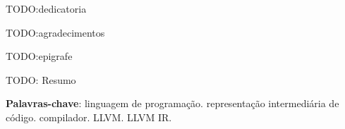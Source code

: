 \documentclass[
  english,
  lmodern,
  oneside
]{ufsc-thesis-rn46-2019/ufsc-thesis-rn46-2019}
\begin{document}
\pretextual{}
\imprimircapa{}
\imprimirfolhaderosto*
\protect%
\imprimirfolhadecertificacao{}



\begin{dedicatoria}
  TODO:\@ dedicatoria
\end{dedicatoria}

\begin{agradecimentos}
  TODO:\@ agradecimentos
\end{agradecimentos}

\begin{epigrafe}
  TODO:\@ epigrafe
\end{epigrafe}


\begin{resumo}[Resumo]
TODO: Resumo

\vspace{\onelineskip}
\noindent
\textbf{Palavras-chave}: linguagem de programação\@. representação intermediária de código\@. compilador\@. LLVM\@. LLVM IR\@.
\end{resumo}
\end{document}
